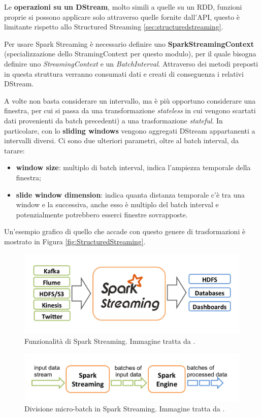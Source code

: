 \documentclass[12pt,italian]{article}
\begin{document}
Le \textbf{operazioni su un DStream}, molto simili a quelle su un RDD, funzioni proprie si possono applicare 
solo attraverso quelle fornite dall'API, questo è limitante rispetto allo Structured Streaming \ref{sec:structuredstreaming}.

\par Per usare Spark Streaming è necessario definire uno \textbf{SparkStreamingContext} (specializzazione dello StramingContext per questo modulo), per il quale bisogna definire uno \textit{StreamingContext} e un \textit{BatchInterval}.
Attraverso dei metodi preposti in questa struttura verranno consumati dati e creati di conseguenza i relativi DStream.

\par A volte non basta considerare un intervallo, ma è più opportuno considerare una finestra, per cui si passa da una transformazione \textit{stateless} in cui vengono scartati dati provenienti da batch precedenti) a una trasformazione \textit{stateful}. In particolare, con lo \textbf{sliding windows} vengono aggregati DStream appartanenti a intervalli diversi.
Ci sono due ulteriori parametri, oltre al batch interval, da tarare:
\begin{itemize}
	\item \textbf{window size}: multiplo di batch interval, indica l'ampiezza temporale della finestra;
	\item \textbf{slide window dimension}: indica quanta distanza temporale c'è tra una window e la successiva, anche esso è multiplo del batch interval e potenzialmente potrebbero esserci finestre sovrapposte.
\end{itemize}
Un'esempio grafico di quello che accade con questo genere di trasformazioni è mostrato in Figura \ref{fig:StructuredStreaming}.
\begin{figure}
	\centering 
	\includegraphics[width=0.8\linewidth]{img/sparkStreaming.png}
	\caption{Funzionalità di Spark Streaming. Immagine tratta da \cite{spark}.}
	\label{fig:SparkStreaming}
\end{figure}
\begin{figure}
	\centering 
	\includegraphics[width=1\linewidth]{img/sparkStreamingBatch.png}
	\caption{Divisione micro-batch in Spark Streaming. Immagine tratta da \cite{spark}.}
	\label{fig:SparkStreamingBatch}
\end{figure}
\end{document}
